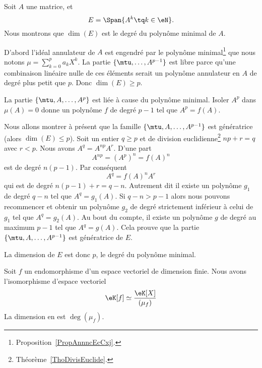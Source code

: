 \begin{example}
	Soit \( A\) une matrice, et
	\begin{equation}
		E=\Span\{A^k\tq k\in \eN \}.
	\end{equation}
	Nous montrons que \( \dim(E)\) est le degré du polynôme minimal de \( A\).

	D'abord l'idéal annulateur de \( A\) est engendré par le polynôme minimal\footnote{Proposition~\ref{PropAnnncEcCxj}.} que nous notons
	\( \mu=\sum_{k=0}^pa_kX^k\).
	La partie \( \{ \mtu,\ldots, A^{p-1} \}\) est libre parce qu'une combinaison linéaire nulle de ces éléments serait un polynôme annulateur en \( A\) de degré plus petit que \( p\). Donc \( \dim(E)\geq p\).

	La partie \( \{ \mtu,A,\ldots, A^p \}\) est liée à cause du polynôme minimal. Isoler \( A^p\) dans \( \mu(A)=0\) donne un polynôme \( f\) de degré \( p-1\) tel que \( A^p=f(A)\).

	Nous allons montrer à présent que la famille \( \{ \mtu,A,\ldots, A^{p-1} \}\) est génératrice (alors \( \dim(E)\leq p\)). Soit un entier \( q\geq p\) et de division euclidienne\footnote{Théorème~\ref{ThoDivisEuclide}.} \( np+r=q\) avec \( r<p\). Nous avons \( A^q=A^{np}A^r\). D'une part
	\begin{equation}
		A^{np}=(A^p)^n=f(A)^n
	\end{equation}
	est de degré \( n(p-1)\). Par conséquent
	\begin{equation}
		A^q=f(A)^nA^r
	\end{equation}
	qui est de degré \( n(p-1)+r=q-n\). Autrement dit il existe un polynôme \( g_1\) de degré \( q-n\) tel que \( A^q=g_1(A)\). Si \( q-n>p-1\) alors nous pouvons recommencer et obtenir un polynôme \( g_2\) de degré strictement inférieur à celui de \( g_1\) tel que \( A^q=g_2(A)\). Au bout du compte, il existe un polynôme \( g\) de degré au maximum \( p-1\) tel que \( A^q=g(A)\). Cela prouve que la partie \( \{ \mtu,A,\ldots, A^{p-1} \}\) est génératrice de \( E\).

	La dimension de \( E\) est donc \( p\), le degré du polynôme minimal.
\end{example}

\begin{proposition}     \label{PropooCFZDooROVlaA}
	Soit \( f\) un endomorphisme d'un espace vectoriel de dimension finie. Nous avons l'isomorphisme d'espace vectoriel
	\begin{equation}
		\eK[f]\simeq\frac{ \eK[X] }{ (\mu_f) }
	\end{equation}
	La dimension en est \( \deg(\mu_f)\).
\end{proposition}

